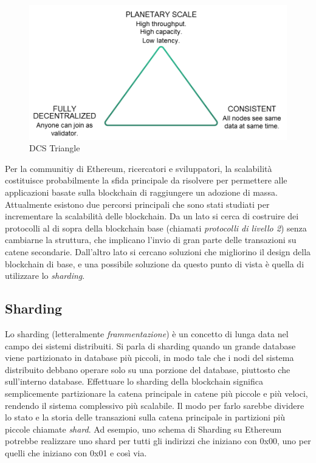 \begin{figure}
    \includegraphics[width=\linewidth]{images/dcs-triangle.png}
    \caption{DCS Triangle}
    \label{fig:dcs_triangle}
\end{figure}

Per la communitiy di Ethereum, ricercatori e sviluppatori, la scalabilità costituisce probabilmente la sfida principale da risolvere per permettere alle applicazioni basate sulla blockchain di raggiungere un adozione di massa. Attualmente esistono due percorsi principali che sono stati studiati per incrementare la scalabilità delle blockchain. Da un lato si cerca di costruire dei protocolli al di sopra della blockchain base (chiamati \textit{protocolli di livello 2}) senza cambiarne la struttura, che implicano l'invio di gran parte delle transazioni su catene secondarie. Dall'altro lato si cercano soluzioni che migliorino il design della blockchain di base, e una possibile soluzione da questo punto di vista è quella di utilizzare lo \textit{sharding}.

\subsection{Sharding}

Lo sharding (letteralmente \textit{frammentazione}) è un concetto di lunga data nel campo dei sistemi distribuiti. Si parla di sharding quando un grande database viene partizionato in database più piccoli, in modo tale che i nodi del sistema distribuito debbano operare solo su una porzione del database, piuttosto che sull'interno database.
Effettuare lo sharding  della blockchain significa semplicemente partizionare la catena principale in catene più piccole e più veloci, rendendo il sistema complessivo più scalabile. Il modo per farlo sarebbe dividere lo stato e la storia delle transazioni sulla catena principale in partizioni più piccole chiamate \textit{shard}. Ad esempio, uno schema di Sharding su Ethereum potrebbe realizzare uno shard per tutti gli indirizzi che iniziano con 0x00, uno per quelli che iniziano con 0x01 e così via. 

